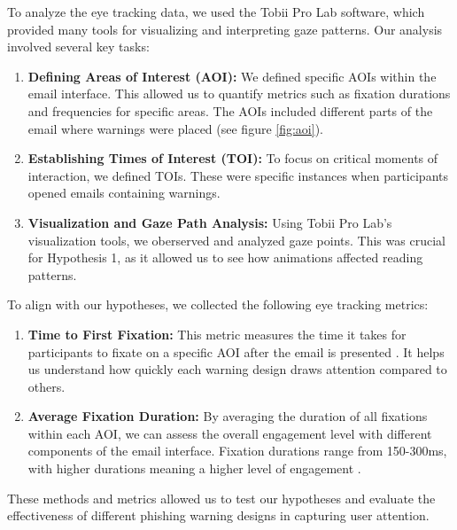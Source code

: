 \documentclass[
  a4paper,  %
  twoside,  %
  bibliography=totoc,
  headsepline,
  cleardoublepage=empty,
  parskip=half,
  draft=false
]{scrbook}
\begin{document}
To analyze the eye tracking data, we used the Tobii Pro Lab software, which provided many tools for visualizing and interpreting gaze patterns. Our analysis involved several key tasks:

\begin{enumerate}
    \item \textbf{Defining Areas of Interest (AOI):} We defined specific AOIs within the email interface. This allowed us to quantify metrics such as fixation durations and frequencies for specific areas. The AOIs included different parts of the email where warnings were placed (see figure \ref{fig:aoi}).
    \item \textbf{Establishing Times of Interest (TOI):} To focus on critical moments of interaction, we defined TOIs. These were specific instances when participants opened emails containing warnings.
    \item \textbf{Visualization and Gaze Path Analysis:} Using Tobii Pro Lab’s visualization tools, we oberserved and analyzed gaze points. This was crucial for Hypothesis 1, as it allowed us to see how animations affected reading patterns.
\end{enumerate}

To align with our hypotheses, we collected the following eye tracking metrics:

\begin{enumerate}
    \item \textbf{Time to First Fixation:} This metric measures the time it takes for participants to fixate on a specific AOI after the email is presented \cite{eyetrack}. It helps us understand how quickly each warning design draws attention compared to others.
    \item \textbf{Average Fixation Duration:} By averaging the duration of all fixations within each AOI, we can assess the overall engagement level with different components of the email interface. Fixation durations range from 150-300ms, with higher durations meaning a higher level of engagement \cite{eyetrack}.
\end{enumerate}

These methods and metrics allowed us to test our hypotheses and evaluate the effectiveness of different phishing warning designs in capturing user attention.
\end{document}
